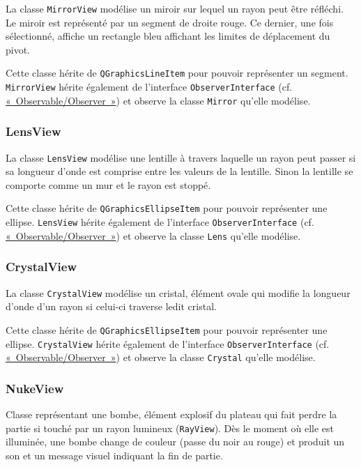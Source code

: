 \documentclass[]{report}
\begin{document}
La classe \texttt{MirrorView} modélise un miroir sur lequel un rayon peut être réfléchi.
Le miroir est représenté par un segment de droite rouge. Ce dernier, une fois sélectionné, affiche
un rectangle bleu affichant les limites de déplacement du pivot. 

Cette classe hérite de \texttt{QGraphicsLineItem} pour pouvoir représenter un segment.
\texttt{MirrorView} hérite également de l'interface \texttt{ObserverInterface} (cf. \hyperref[OO]{«~Observable/Observer~»}) et observe
la classe \texttt{Mirror} qu'elle modélise.

\subsubsection{\label{LensView}LensView}

La classe \texttt{LensView} modélise une lentille à travers laquelle un rayon peut passer si sa longueur d’onde est
comprise entre les valeurs de la lentille. Sinon la lentille se comporte comme un mur et le rayon 
est stoppé. 

Cette classe hérite de \texttt{QGraphicsEllipseItem} pour pouvoir représenter une ellipse.
\texttt{LensView} hérite également de l'interface \texttt{ObserverInterface} (cf. \hyperref[OO]{«~Observable/Observer~»}) et observe
la classe \texttt{Lens} qu'elle modélise.

\subsubsection{\label{CrystalView}CrystalView}

La classe \texttt{CrystalView} modélise un cristal, élément ovale qui modifie la longueur d’onde d’un rayon si
celui-ci traverse ledit cristal.

Cette classe hérite de \texttt{QGraphicsEllipseItem} pour pouvoir représenter une ellipse.
\texttt{CrystalView} hérite également de l'interface \texttt{ObserverInterface} (cf. \hyperref[OO]{«~Observable/Observer~»}) et observe
la classe \texttt{Crystal} qu'elle modélise.

\subsubsection{\label{NukeView}NukeView}

Classe représentant une bombe, élément explosif du plateau qui fait perdre la partie
si touché par un rayon lumineux (\texttt{RayView}). Dès le moment où elle est illuminée, une bombe
change de couleur (passe du noir au rouge) et produit un son et un message visuel indiquant la fin de partie.
\end{document}
